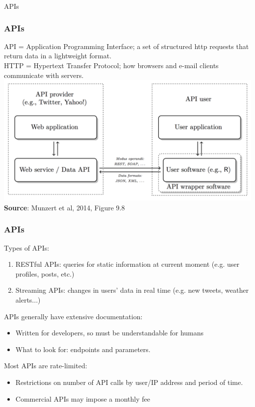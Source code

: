 \documentclass{beamer}
\begin{document}
\begin{frame}
	
	\centering\Huge{APIs}
	
\end{frame}



\begin{frame}
	\frametitle{APIs}
	
	API = Application Programming Interface; a set of structured http requests that return data in a lightweight format.\\
	\vspace{.25cm}
	\pause
	HTTP = Hypertext Transfer Protocol; how browsers and e-mail clients communicate with servers.\\
	\vspace{.20cm}
	\includegraphics[width=.9\textwidth]{figures/apis.png} \\
	\hfill\small{\textbf{Source}: Munzert et al, 2014, Figure 9.8}
	
	
\end{frame}

\begin{frame}
	\frametitle{APIs}
	Types of APIs:  
	\begin{enumerate}
		\item \alert{RESTful APIs}: queries for static information at current moment (e.g. user profiles, posts, etc.)  
		\item \alert{Streaming APIs}: changes in users' data in real time (e.g. new tweets, weather alerts...)  
	\end{enumerate}
	\pause
	\vspace{.10cm}
	APIs generally have extensive \alert{documentation}:
	\begin{itemize}
		\item Written for developers, so must be understandable for humans
		\item What to look for: \alert{endpoints} and \alert{parameters.}
	\end{itemize}
	\pause
	\vspace{.10cm}
	Most APIs are \alert{rate-limited:}
	\begin{itemize}
		\item Restrictions on number of API calls by user/IP address and period of time.
		\item Commercial APIs may impose a monthly fee
	\end{itemize}
\end{frame}
\end{document}
